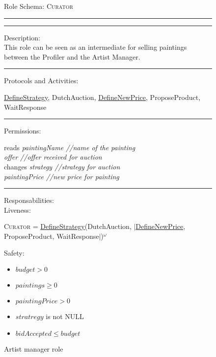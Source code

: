 \documentclass[a4paper,11pt]{report}
\begin{document}
  
  \begin{figure}[ht!]
    \begin{mdframed}
      Role Schema: \textsc{Curator} \\ \hrule \vspace{2pt} \hrule \vspace{10pt}
      Description:\\
      This role can be seen as an intermediate for selling paintings between the Profiler
      and the Artist Manager.
      \\ \hrule \vspace{10pt}
      Protocols and Activities:
      \vspace{-10pt}
      \begin{flushleft}
       \underline{DefineStrategy}, DutchAuction,
       \underline{DefineNewPrice},
       ProposeProduct, WaitResponse
      \end{flushleft}
      \hrule \vspace{10pt}
      Permissions:\\
      \vspace{-10pt}
      \begin{center}
       reads \textit{paintingName //name of the painting}\\
	    \textit{offer //offer received for auction}\\
       changes \textit{strategy //strategy for auction}\\
       \textit{paintingPrice //new price for painting}
      \end{center}
      \hrule \vspace{10pt}
      Responsabilities:\\
      Liveness:
      \vspace{-10pt}
      \begin{flushleft}
      \small\textsc{Curator} = \underline{DefineStrategy}(DutchAuction, $\mid$\underline{DefineNewPrice},
       ProposeProduct, WaitResponse$\mid$)$^\omega$
      \end{flushleft}
      Safety:
      \vspace{-10pt}
      \begin{itemize}
      \item $budget > 0$
       \item $paintings \geq 0$
       \item $paintingPrice > 0$
       \item $stratregy$ is not NULL
       \item $bidAccepted \leq budget$
      \end{itemize}
    \end{mdframed}
  \caption{Artist manager role}
  \label{figure:role_curator}
  \end{figure}
  
\end{document}
